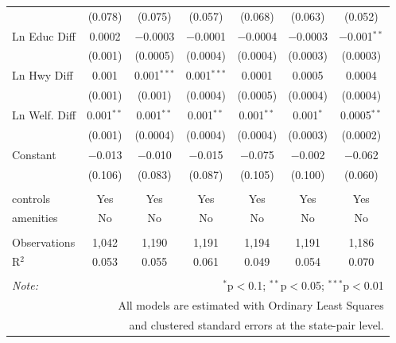 \begin{table}[!htbp]
\begin{tabular}{@{\extracolsep{5pt}}lcccccc}
  & (0.078) & (0.075) & (0.057) & (0.068) & (0.063) & (0.052) \\ 
  Ln Educ Diff & 0.0002 & $-$0.0003 & $-$0.0001 & $-$0.0004 & $-$0.0003 & $-$0.001$^{**}$ \\ 
  & (0.001) & (0.0005) & (0.0004) & (0.0004) & (0.0003) & (0.0003) \\ 
  Ln Hwy Diff & 0.001 & 0.001$^{***}$ & 0.001$^{***}$ & 0.0001 & 0.0005 & 0.0004 \\ 
  & (0.001) & (0.001) & (0.0004) & (0.0005) & (0.0004) & (0.0004) \\ 
  Ln Welf. Diff & 0.001$^{**}$ & 0.001$^{**}$ & 0.001$^{**}$ & 0.001$^{**}$ & 0.001$^{*}$ & 0.0005$^{**}$ \\ 
  & (0.001) & (0.0004) & (0.0004) & (0.0004) & (0.0003) & (0.0002) \\ 
  Constant & $-$0.013 & $-$0.010 & $-$0.015 & $-$0.075 & $-$0.002 & $-$0.062 \\ 
  & (0.106) & (0.083) & (0.087) & (0.105) & (0.100) & (0.060) \\ 
 \hline \\[-1.8ex] 
controls & Yes & Yes & Yes & Yes & Yes & Yes \\ 
amenities & No & No & No & No & No & No \\ 
\hline \\[-1.8ex] 
Observations & 1,042 & 1,190 & 1,191 & 1,194 & 1,191 & 1,186 \\ 
R$^{2}$ & 0.053 & 0.055 & 0.061 & 0.049 & 0.054 & 0.070 \\ 
\hline 
\hline \\[-1.8ex] 
\textit{Note:}  & \multicolumn{6}{r}{$^{*}$p$<$0.1; $^{**}$p$<$0.05; $^{***}$p$<$0.01} \\ 
 & \multicolumn{6}{r}{All models are estimated with Ordinary Least Squares} \\ 
 & \multicolumn{6}{r}{and clustered standard errors at the state-pair level.} \\ 
\end{tabular} 
\end{table} 
